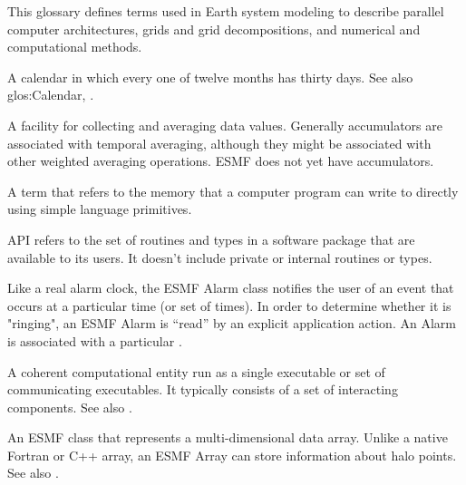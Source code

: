 
\label{sec:glos}

This glossary defines terms used in Earth system modeling to describe 
parallel computer architectures, grids and grid decompositions, and 
numerical and computational methods.

\begin{description}

\label{glos:360DayCal}
\item[360-day calendar] A calendar in which 
  every one of twelve months has thirty days.  See also 
  {glos:Calendar}, .

\label{glos:Accumulator}
\item[Accumulator] A facility for collecting 
  and averaging data values.  Generally accumulators are associated with 
  temporal averaging, although they might be associated with 
  other weighted averaging operations.  ESMF does not yet have accumulators.

\label{glos:ASP}
\item[Address space (ASP)] A term that refers to 
  the memory that a computer program can write to directly using
  simple language primitives. 

\label{glos:API}
\item[Application Programming Interface (API)] API refers to the 
  set of routines and types in a software package that are
  available to its users.  It doesn't include private or internal
  routines or types.
  
\label{glos:Alarm}
\item[Alarm] Like a real alarm clock, the ESMF Alarm class notifies
  the user of an event that occurs at a particular 
  time (or set of times).  In order to determine whether it
  is "ringing", an ESMF Alarm is ``read'' by an explicit
  application action.  An Alarm is associated
  with a particular .

\label{glos:Application}
\item[Application] A coherent computational 
  entity run as a single executable or set of communicating executables.  
  It typically consists of a set of interacting components.  
  See also .

\label{glos:Array}
\item[Array] An ESMF class that represents a multi-dimensional
  data array.  Unlike a native Fortran or C++ array, an ESMF Array
  can store information about halo points.  See also .


\end{description}
